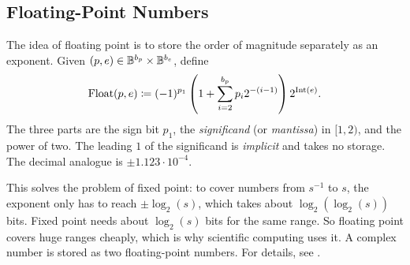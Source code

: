 \subsection{Floating-Point Numbers}

The idea of floating point is to store the order of magnitude separately as an exponent. Given $(p, e) \in \mathbb{B}^{b_p} \times \mathbb{B}^{b_e}$, define
\begin{equation}
  \operatorname{Float}(p, e) \coloneqq (-1)^{p_1} \left(1 + \sum_{i=2}^{b_p} p_i 2^{-(i-1)}\right) 2^{\operatorname{Int}(e)}.
\end{equation}
The three parts are the sign bit $p_1$, the \emph{significand} (or \emph{mantissa}) in $[1, 2)$, and the power of two. The leading $1$ of the significand is \emph{implicit} and takes no storage. The decimal analogue is $\pm 1.123 \cdot 10^{-4}$.

This solves the problem of fixed point: to cover numbers from $s^{-1}$ to $s$, the exponent only has to reach $\pm\log_2(s)$, which takes about $\log_2(\log_2(s))$ bits. Fixed point needs about $\log_2(s)$ bits for the same range. So floating point covers huge ranges cheaply, which is why scientific computing uses it. A complex number is stored as two floating-point numbers. For details, see \cite{Overton}.


